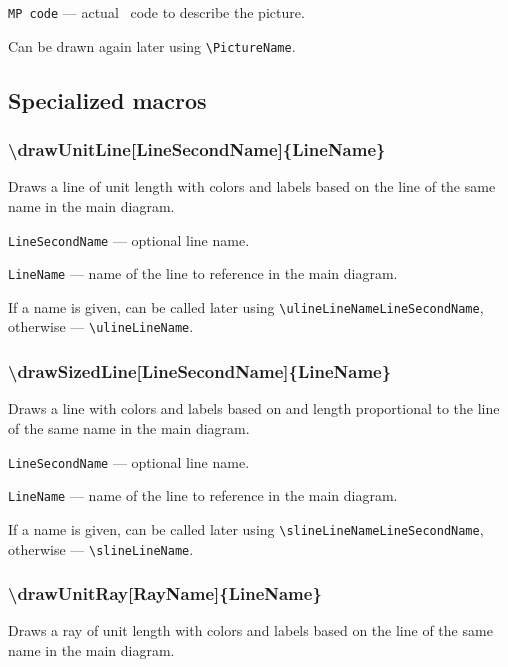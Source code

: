 \documentclass{ltxdoc}
\begin{document}
	\texttt{MP code} — actual \METAPOST\ code to describe the picture.
	
	Can be drawn again later using \texttt{\textbackslash PictureName}.


\subsection{Specialized macros}

\subsubsection{\textbackslash drawUnitLine[LineSecondName]\{LineName\}}

	Draws a line of unit length with colors and labels based on the line of the same name in the main diagram.

	\texttt{LineSecondName} — optional line name.
	
	\texttt{LineName} — name of the line to reference in the main diagram. 

	If a name is given, can be called later using \texttt{\textbackslash ulineLineNameLineSecondName}, otherwise — \texttt{\textbackslash ulineLineName}. 
	

\subsubsection{\textbackslash drawSizedLine[LineSecondName]\{LineName\}}

	Draws a line with colors and labels based on and length proportional to the line of the same name in the main diagram.

	\texttt{LineSecondName} — optional line name. 
	
	\texttt{LineName} — name of the line to reference in the main diagram. 
	
	If a name is given, can be called later using \texttt{\textbackslash slineLineNameLineSecondName}, otherwise — \texttt{\textbackslash slineLineName}. 

\subsubsection{\textbackslash drawUnitRay[RayName]\{LineName\}}

	Draws a ray of unit length with colors and labels based on the line of the same name in the main diagram.
\end{document}
